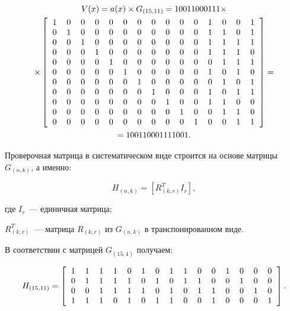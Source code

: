 \begin{gather*}
  V(x) = a(x) \times G_{(15, 11)} = 10011000111 \times \\
  \times\left[\begin{tabular}{l*{15}{c}r}
      1 & 0 & 0 & 0 & 0 & 0 & 0 & 0 & 0 & 0 & 0 & 1 & 0 & 0 & 1\\
      0 & 1 & 0 & 0 & 0 & 0 & 0 & 0 & 0 & 0 & 0 & 1 & 1 & 0 & 1\\ 
      0 & 0 & 1 & 0 & 0 & 0 & 0 & 0 & 0 & 0 & 0 & 1 & 1 & 1 & 1\\ 
      0 & 0 & 0 & 1 & 0 & 0 & 0 & 0 & 0 & 0 & 0 & 1 & 1 & 1 & 0\\ 
      0 & 0 & 0 & 0 & 1 & 0 & 0 & 0 & 0 & 0 & 0 & 0 & 1 & 1 & 1\\ 
      0 & 0 & 0 & 0 & 0 & 1 & 0 & 0 & 0 & 0 & 0 & 1 & 0 & 1 & 0\\ 
      0 & 0 & 0 & 0 & 0 & 0 & 1 & 0 & 0 & 0 & 0 & 0 & 1 & 0 & 1\\ 
      0 & 0 & 0 & 0 & 0 & 0 & 0 & 1 & 0 & 0 & 0 & 1 & 0 & 1 & 1\\ 
      0 & 0 & 0 & 0 & 0 & 0 & 0 & 0 & 1 & 0 & 0 & 1 & 1 & 0 & 0\\ 
      0 & 0 & 0 & 0 & 0 & 0 & 0 & 0 & 0 & 1 & 0 & 0 & 1 & 1 & 0\\ 
      0 & 0 & 0 & 0 & 0 & 0 & 0 & 0 & 0 & 0 & 1 & 0 & 0 & 1 & 1
    \end{tabular}\right] = \\
  = 100110001111001.
\end{gather*}

Проверочная матрица в систематическом виде строится на основе матрицы
$G_{(n,k)}$, а именно:

\begin{equation*}
  H_{(n, k)} = \left[R^T_{(k, r)} I_r \right],
\end{equation*}

\begin{ESKDexplanation}
\item[где ]  $I_r$~--- единичная матрица; 
\item $R^T_{(k, r)}$~--- матрица $R_{(k, r)}$ из
$G_{(n,k)}$ в транспонированном виде. 
\end{ESKDexplanation}
  
В соответствии с матрицей $G_{(15,4)}$ получаем:

\begin{equation*}
  H_{(15, 11)} =  \left[
    \begin{tabular}{l*{15}{c}r}
      1 & 1 & 1 & 1 & 0 & 1 & 0 & 1 & 1 & 0 & 0 & 1 & 0 & 0 & 0\\
      0 & 1 & 1 & 1 & 1 & 0 & 1 & 0 & 1 & 1 & 0 & 0 & 1 & 0 & 0\\ 
      0 & 0 & 1 & 1 & 1 & 1 & 0 & 1 & 0 & 1 & 1 & 0 & 0 & 1 & 0\\ 
      1 & 1 & 1 & 0 & 1 & 0 & 1 & 1 & 0 & 0 & 1 & 0 & 0 & 0 & 1\\ 
    \end{tabular}
  \right].
\end{equation*}

